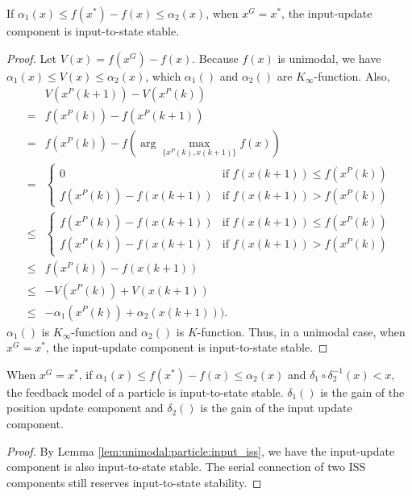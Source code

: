 \begin{mylem}
\label{lem:unimodal:particle:input_iss}
If $ \alpha_{1} (x) \leq f(x^{*}) - f(x) \leq \alpha_{2} (x) $, when $ x^{G} = x^{*} $, the input-update component is input-to-state stable.
\begin{proof}
Let $ V(x) = f(x^{G}) - f(x) $.
Because $ f(x) $ is unimodal, we have
$ \alpha_{1} (x) \leq V(x) \leq \alpha_{2} (x)  $, 
which $ \alpha_{1} () $ and $ \alpha_{2} () $ are $ K_{\infty} $-function.
Also,
\begin{equation}
\begin{aligned}
& V(x^{P}(k+1)) - V(x^{P}(k)) \\
= & f(x^{P} (k)) - f(x^{P} (k+1)) \\
= & f(x^{P}(k)) - f( \arg \max_{ \{ x^{P}(k), x(k+1)  \} } f(x) )  \\
= & 
\left\{\begin{matrix}
0  & \mbox{if } f(x(k+1)) \leq f(x^{P}(k)) \\ 
f(x^{P}(k)) - f(x(k+1)) & \mbox{if } f(x(k+1)) > f(x^{P}(k))
\end{matrix}\right. \\
\leq & 
\left\{\begin{matrix}
f(x^{P}(k)) - f(x(k+1))  & \mbox{if } f(x(k+1)) \leq f(x^{P}(k)) \\ 
f(x^{P}(k)) - f(x(k+1)) & \mbox{if } f(x(k+1)) > f(x^{P}(k))
\end{matrix}\right. \\
\leq & f(x^{P}(k)) - f(x(k+1)) \\
\leq & - V(x^{P}(k)) + V(x(k+1)) \\
\leq & - \alpha_{1} ( x^{P}(k) ) + \alpha_{2} (x(k+1))).
\end{aligned}
\end{equation} 
$ \alpha_{1} () $ is $ K_{\infty} $-function and $ \alpha_{2} () $ is $ K $-function.
Thus, in a unimodal case, when $ x^{G} = x^{*} $, the input-update component is input-to-state stable.
\end{proof}
\end{mylem}

\begin{mylem}
\label{lem:unimodal:particle:iss}
When $ x^{G} = x^{*} $, if $ \alpha_{1} (x) \leq f(x^{*}) - f(x) \leq \alpha_{2} (x) $ and $ \delta_{1} \circ \delta_{2}^{-1} (x)  < x $, the feedback model of a particle is input-to-state stable.
$ \delta_{1} () $ is the gain of the position update component and $ \delta_{2} () $ is the gain of the input update component.
\begin{proof}
By Lemma \ref{lem:unimodal:particle:input_iss}, we have the input-update component is also input-to-state stable.
The serial connection of two ISS components still reserves input-to-state stability.
\end{proof}
\end{mylem}


